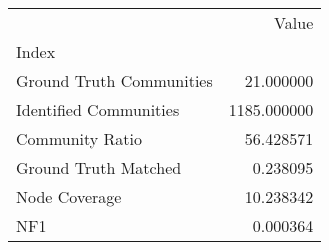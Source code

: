 \begin{tabular}{lr}
\toprule
{} &        Value \\
Index                    &              \\
\midrule
Ground Truth Communities &    21.000000 \\
Identified Communities   &  1185.000000 \\
Community Ratio          &    56.428571 \\
Ground Truth Matched     &     0.238095 \\
Node Coverage            &    10.238342 \\
NF1                      &     0.000364 \\
\bottomrule
\end{tabular}
